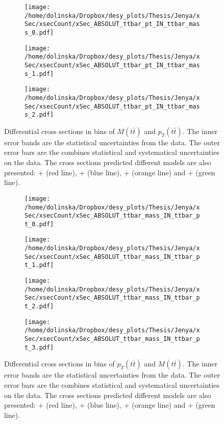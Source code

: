 \begin{figure}[p]
\centering
\begin{subfigure}
  \centering
  \texttt{[image: /home/dolinska/Dropbox/desy\_plots/Thesis/Jenya/xSec/xsecCount/xSec\_ABSOLUT\_ttbar\_pt\_IN\_ttbar\_mass\_0.pdf]}
\end{subfigure}
\begin{subfigure}
  \centering
  \texttt{[image: /home/dolinska/Dropbox/desy\_plots/Thesis/Jenya/xSec/xsecCount/xSec\_ABSOLUT\_ttbar\_pt\_IN\_ttbar\_mass\_1.pdf]}
\end{subfigure}
\begin{subfigure}
  \centering
  \texttt{[image: /home/dolinska/Dropbox/desy\_plots/Thesis/Jenya/xSec/xsecCount/xSec\_ABSOLUT\_ttbar\_pt\_IN\_ttbar\_mass\_2.pdf]}
\end{subfigure}
\caption{Differential cross sections in bins of $M(t\bar{t})$ and $p_{T}(t\bar{t})$. The inner error bands are the statistical uncertainties from the data.
         The outer error bars are the combines statistical and systematical uncertainties on the data. The cross sections predicted different models are also presented:
         \MG + \PYTHIA (red line), \Powheg + \PYTHIA (blue line), \Powheg + \HERWIG (orange line) and \MCNLO + \HERWIG (green line).}
\label{fig:XSU_2D_Mtt_pttt}
\end{figure}
\begin{figure}[p]
\centering
\begin{subfigure}
  \centering
  \texttt{[image: /home/dolinska/Dropbox/desy\_plots/Thesis/Jenya/xSec/xsecCount/xSec\_ABSOLUT\_ttbar\_mass\_IN\_ttbar\_pt\_0.pdf]}
\end{subfigure}
\begin{subfigure}
  \centering
  \texttt{[image: /home/dolinska/Dropbox/desy\_plots/Thesis/Jenya/xSec/xsecCount/xSec\_ABSOLUT\_ttbar\_mass\_IN\_ttbar\_pt\_1.pdf]}
\end{subfigure}
\begin{subfigure}
  \centering
  \texttt{[image: /home/dolinska/Dropbox/desy\_plots/Thesis/Jenya/xSec/xsecCount/xSec\_ABSOLUT\_ttbar\_mass\_IN\_ttbar\_pt\_2.pdf]}
\end{subfigure}
\begin{subfigure}
  \centering
  \texttt{[image: /home/dolinska/Dropbox/desy\_plots/Thesis/Jenya/xSec/xsecCount/xSec\_ABSOLUT\_ttbar\_mass\_IN\_ttbar\_pt\_3.pdf]}
\end{subfigure}
\caption{Differential cross sections in bins of $p_{T}(t\bar{t})$ and $M(t\bar{t})$. The inner error bands are the statistical uncertainties from the data.
         The outer error bars are the combines statistical and systematical uncertainties on the data. The cross sections predicted different models are also presented:
         \MG + \PYTHIA (red line), \Powheg + \PYTHIA (blue line), \Powheg + \HERWIG (orange line) and \MCNLO + \HERWIG (green line).}
\label{fig:XSU_2D_Mtt_pttt1}
\end{figure}


